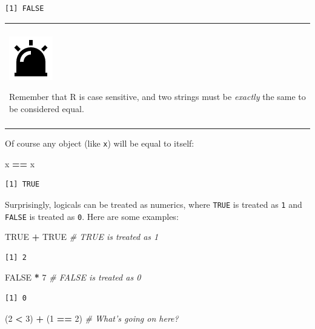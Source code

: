 \documentclass[
]{book}
\newenvironment{Shaded}{\begin{snugshade}}{\end{snugshade}}
\newcommand{\CommentTok}[1]{\textcolor[rgb]{0.56,0.35,0.01}{\textit{#1}}}
\newcommand{\DecValTok}[1]{\textcolor[rgb]{0.00,0.00,0.81}{#1}}
\newcommand{\NormalTok}[1]{#1}
\newcommand{\OperatorTok}[1]{\textcolor[rgb]{0.81,0.36,0.00}{\textbf{#1}}}
\newcommand{\OtherTok}[1]{\textcolor[rgb]{0.56,0.35,0.01}{#1}}
\newcommand{\StringTok}[1]{\textcolor[rgb]{0.31,0.60,0.02}{#1}}
\newenvironment{caution}
{
  \begin{center}
  \begin{tabular}{|>{\columncolor{caution}}p{0.9\textwidth}|}
  \hline\\
  \includegraphics[scale=0.1]{src/images/alarm-warning-fill.png}
}
{\\\\\hline
  \end{tabular}
  \end{center}
}
\begin{document}
\begin{verbatim}
[1] FALSE
\end{verbatim}

\begin{caution}
Remember that R is case sensitive, and two strings must be
\emph{exactly} the same to be considered equal.
\end{caution}

Of course any object (like \texttt{x}) will be equal to itself:

\begin{Shaded}
\begin{Highlighting}[]
\NormalTok{x }\OperatorTok{==}\StringTok{ }\NormalTok{x}
\end{Highlighting}
\end{Shaded}

\begin{verbatim}
[1] TRUE
\end{verbatim}

Surprisingly, logicals can be treated as numerics, where \texttt{TRUE} is treated as \texttt{1} and \texttt{FALSE} is treated as \texttt{0}.
Here are some examples:

\begin{Shaded}
\begin{Highlighting}[]
\OtherTok{TRUE} \OperatorTok{+}\StringTok{ }\OtherTok{TRUE}  \CommentTok{# TRUE is treated as 1}
\end{Highlighting}
\end{Shaded}

\begin{verbatim}
[1] 2
\end{verbatim}

\begin{Shaded}
\begin{Highlighting}[]
\OtherTok{FALSE} \OperatorTok{*}\StringTok{ }\DecValTok{7}  \CommentTok{# FALSE is treated as 0}
\end{Highlighting}
\end{Shaded}

\begin{verbatim}
[1] 0
\end{verbatim}

\begin{Shaded}
\begin{Highlighting}[]
\NormalTok{(}\DecValTok{2} \OperatorTok{<}\StringTok{ }\DecValTok{3}\NormalTok{) }\OperatorTok{+}\StringTok{ }\NormalTok{(}\DecValTok{1} \OperatorTok{==}\StringTok{ }\DecValTok{2}\NormalTok{)  }\CommentTok{# What's going on here? }
\end{Highlighting}
\end{Shaded}
\end{document}
